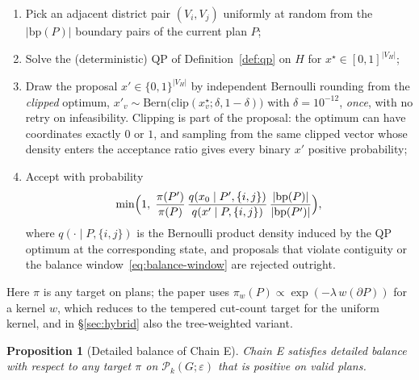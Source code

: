 \documentclass[11pt]{article}
\newtheorem{proposition}{Proposition}[section]
\begin{document}
\begin{enumerate}
  \item Pick an adjacent district pair $(V_i, V_j)$ uniformly at random
    from the $|\mathrm{bp}(P)|$ boundary pairs of the current plan $P$;
  \item Solve the (deterministic) QP of Definition~\ref{def:qp} on
    $H$ for $x^\star \in [0,1]^{|V_H|}$;
  \item Draw the proposal $x' \in \{0,1\}^{|V_H|}$ by independent
    Bernoulli rounding from the \emph{clipped} optimum,
    $x'_v \sim \mathrm{Bern}\bigl(\mathrm{clip}(x^\star_v;
    \delta, 1-\delta)\bigr)$ with $\delta = 10^{-12}$,
    \emph{once}, with no retry on infeasibility. Clipping is part of
    the proposal: the optimum can have coordinates exactly $0$ or $1$,
    and sampling from the same clipped vector whose density enters
    the acceptance ratio gives every binary $x'$ positive
    probability;
  \item Accept with probability
    \begin{equation}\label{eq:qpmh-accept}
      \min\Bigl(1,\;
      \frac{\pi(P')}{\pi(P)}\,
      \frac{q(x_0 \mid P', \{i,j\})}{q(x' \mid P, \{i,j\})}\,
      \frac{|\mathrm{bp}(P)|}{|\mathrm{bp}(P')|}\Bigr),
    \end{equation}
    where $q(\cdot \mid P, \{i,j\})$ is the Bernoulli product density
    induced by the QP optimum at the corresponding state, and proposals
    that violate contiguity or the balance
    window~\eqref{eq:balance-window} are rejected outright.
\end{enumerate}

Here $\pi$ is any target on plans; the paper uses
$\pi_w(P) \propto \exp(-\lambda\, w(\partial P))$ for a kernel $w$,
which reduces to the tempered cut-count target for the uniform
kernel, and in \S\ref{sec:hybrid} also the tree-weighted variant.

\begin{proposition}[Detailed balance of Chain E]\label{prop:qpmh-db}
Chain E satisfies detailed balance with respect to any target $\pi$ on
$\mathcal{P}_k(G; \varepsilon)$ that is positive on valid plans.
\end{proposition}
\end{document}
